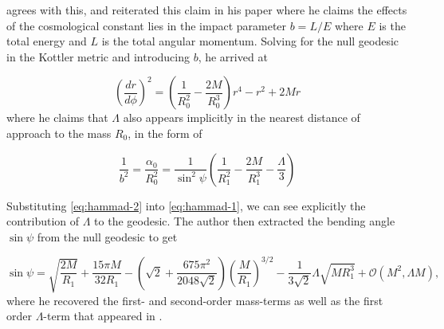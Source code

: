 \citet{HAMMAD2013} agrees with this, and reiterated this claim in his paper where he claims the effects of the cosmological constant lies in the impact parameter $b = L/E$ where $E$ is the total energy and $L$ is the total angular momentum. Solving for the null geodesic in the Kottler metric and introducing $b$, he arrived at 


\begin{equation}
  \left ( \frac{dr}{d \phi} \right )^2 = \left ( \frac{1}{R_0^2} - \frac{2M}{R_0^3} \right )r^4 - r^2 + 2Mr
  \label{eq:hammad-1}
\end{equation}
where he claims that $\Lambda$ also appears implicitly in the nearest distance of approach to the mass $R_0$, in the form of

\begin{equation}
  \frac{1}{b^2} = \frac{\alpha_0}{R_0^2} = \frac{1}{\sin^2 \psi} \left ( \frac{1}{R_1^2} - \frac{2M}{R_1^3} - \frac{\Lambda}{3}\right )
  \label{eq:hammad-2}
\end{equation}

Substituting \eqref{eq:hammad-2} into \eqref{eq:hammad-1}, we can see explicitly the contribution of $\Lambda$ to the geodesic. The author then extracted the bending angle $\sin \psi$ from the null geodesic to get

\begin{equation}
  \sin \psi = \sqrt{\frac{2M}{R_1}} + \frac{15 \pi M}{32 R_1} - \left ( \sqrt{2} + \frac{675 \pi^2}{2048 \sqrt{2}} \right ) \left ( \frac{M}{R_1}\right )^{3/2} - \frac{1}{3\sqrt{2}} \Lambda \sqrt{MR_1^3} + \mathcal{O}(M^2, \Lambda M), 
  \label{eq:hammad-3}
\end{equation}
where he recovered the first- and second-order mass-terms as well as the first order $\Lambda$-term that appeared in \citet{Rindler2007}. 

